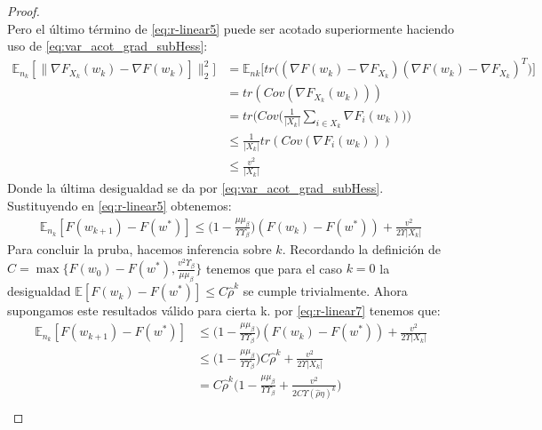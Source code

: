 \documentclass{book}
\theoremstyle{plain}
\theoremstyle{definition}
\theoremstyle{remark}
\begin{document}
\begin{proof}
\begin{equation}
\end{equation}
Pero el último término de \ref{eq:r-linear5} puede ser acotado superiormente haciendo uso de  \ref{eq:var_acot_grad_subHess}: 
\begin{equation}\label{eq:r-linear6} 
    \begin{split}
        \mathbb{E}_{n_k}[\|\nabla F_{X_k}(w_k) - \nabla F(w_k)]\|_2^2] & = \mathbb{E}_{nk}\bigg[tr\bigg((\nabla F(w_k)-\nabla F_{X_k})(\nabla F(w_k)-\nabla F_{X_k})^T\bigg)\bigg] \\
        & = tr(Cov(\nabla F_{X_k}(w_k))) \\
        & = tr\bigg(Cov\bigg(\frac{1}{|X_k|}\displaystyle\sum_{i\in X_k}\nabla F_i(w_k)\bigg)\bigg)\\
        & \leq \frac{1}{|X_k|}tr(Cov(\nabla F_i(w_k))) \\
        & \leq \frac{v^2}{|X_k|}
    \end{split}
\end{equation}
Donde la última desigualdad se da por \ref{eq:var_acot_grad_subHess}. Sustituyendo en \ref{eq:r-linear5} obtenemos:  
\begin{equation}\label{eq:r-linear7} 
    \begin{split}
        \mathbb{E}_{n_k}[F(w_{k+1})- F(w^*)] \leq\bigg(1 -\frac{\mu\mu_\beta}{\Upsilon\Upsilon_\beta}\bigg)(F(w_k) - F(w^*))+ \frac{v^2}{2\Upsilon|X_k|}
    \end{split}
\end{equation}
Para concluir la pruba, hacemos inferencia sobre $k$. Recordando la definición de $C = \max\bigg\{F(w_0) - F(w^*), \frac{v^2\Upsilon_\beta}{\mu\mu_\beta}\bigg\}$ tenemos que para el caso $k=0$ la desigualdad $\mathbb{E}[F(w_k) - F(w^*)] \leq C\hat{\rho}^k$ se cumple trivialmente. Ahora supongamos este resultados válido para cierta k. por \ref{eq:r-linear7} tenemos que: 
\begin{equation}\label{eq:r-linear8} 
    \begin{split}
        \mathbb{E}_{n_k}[F(w_{k+1})- F(w^*)] & \leq\bigg(1 -\frac{\mu\mu_\beta}{\Upsilon\Upsilon_\beta}\bigg)(F(w_k) - F(w^*))+ \frac{v^2}{2\Upsilon|X_k|}\\
        & \leq \bigg(1 -\frac{\mu\mu_\beta}{\Upsilon\Upsilon_\beta}\bigg)C\hat{\rho}^k+ \frac{v^2}{2\Upsilon|X_k|}\\
        & = C\hat{\rho}^k\bigg(1 -\frac{\mu\mu_\beta}{\Upsilon\Upsilon_\beta}+ \frac{v^2}{2C\Upsilon(\hat{\rho}\eta)^k}\bigg)\\
    \end{split}

\end{equation}
\end{proof}
\end{document}
